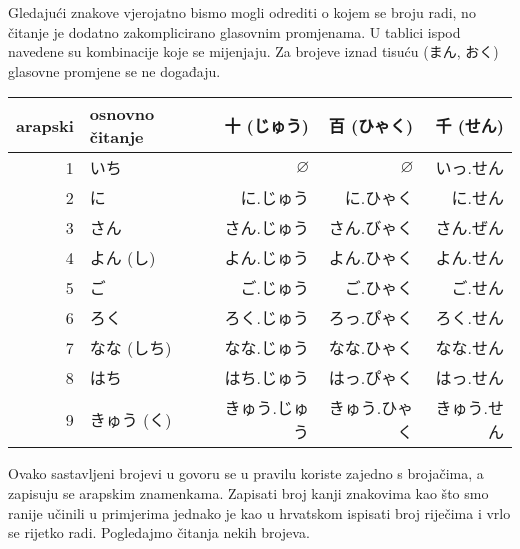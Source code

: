 	Gledajući znakove vjerojatno bismo mogli odrediti o kojem se broju radi, no čitanje je dodatno zakomplicirano glasovnim promjenama. U tablici ispod navedene su kombinacije koje se mijenjaju. Za brojeve iznad tisuću (まん, おく) glasovne promjene se ne događaju.
	
	\vspace{5pt}
	\begin{table}[h]
		\centering
		\begin{tabular}{r l r r r}\toprule[2pt]
			arapski & osnovno čitanje & 十 (じゅう) & 百 (ひゃく) & 千 (せん)\\
			\midrule
			1			& いち & $\varnothing$ & $\varnothing$ & \colorbox{blue!10}{いっ.せん} \\
			2			& に & に.じゅう & に.ひゃく & に.せん \\
			3			& さん & さん.じゅう & \colorbox{blue!10}{さん.びゃく} & \colorbox{blue!10}{さん.ぜん} \\
			4			& よん (し\footnotemark[1]) & よん.じゅう & よん.ひゃく & よん.せん \\
			5			& ご & ご.じゅう & ご.ひゃく & ご.せん \\
			6			& ろく & ろく.じゅう & \colorbox{blue!10}{ろっ.ぴゃく} & ろく.せん \\
			7			& なな (しち\footnotemark[1]) & なな.じゅう & なな.ひゃく & なな.せん \\
			8			& はち & はち.じゅう & \colorbox{blue!10}{はっ.ぴゃく} & \colorbox{blue!10}{はっ.せん} \\
			9			& きゅう (く\footnotemark[1]) & きゅう.じゅう & きゅう.ひゃく & きゅう.せん \\
			\bottomrule
		\end{tabular}
	\end{table}


	\vspace{5pt}
	Ovako sastavljeni brojevi u govoru se u pravilu koriste zajedno s brojačima, a zapisuju se arapskim znamenkama. Zapisati broj kanji znakovima kao što smo ranije učinili u primjerima jednako je kao u hrvatskom ispisati broj riječima i vrlo se rijetko radi. Pogledajmo čitanja nekih brojeva.
	
	\begin{reibun}
	\end{reibun}

